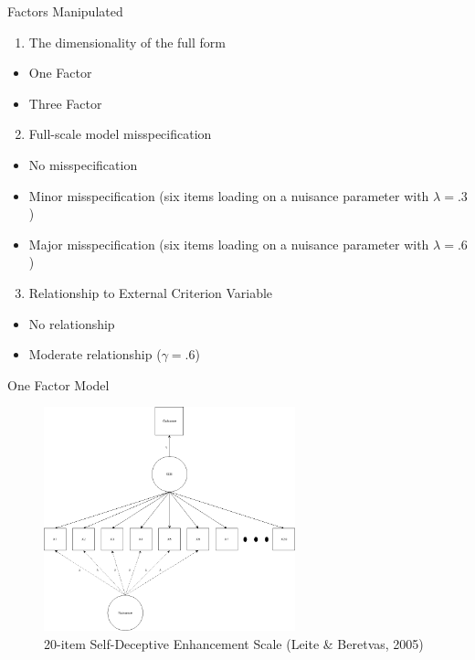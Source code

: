 \documentclass[ignorenonframetext,]{beamer}
\providecommand{\tightlist}{%
  \setlength{\itemsep}{0pt}\setlength{\parskip}{0pt}}
\begin{document}
\begin{frame}{Factors Manipulated}
\protect\hypertarget{factors-manipulated}{}

\begin{enumerate}
\tightlist
\item
  The dimensionality of the full form
\end{enumerate}

\begin{itemize}
\tightlist
\item
  One Factor
\item
  Three Factor
\end{itemize}

\begin{enumerate}
\setcounter{enumi}{1}
\tightlist
\item
  Full-scale model misspecification
\end{enumerate}

\begin{itemize}
\tightlist
\item
  No misspecification
\item
  Minor misspecification (six items loading on a nuisance parameter with
  \(\lambda=.3\))
\item
  Major misspecification (six items loading on a nuisance parameter with
  \(\lambda=.6\))
\end{itemize}

\begin{enumerate}
\setcounter{enumi}{2}
\tightlist
\item
  Relationship to External Criterion Variable
\end{enumerate}

\begin{itemize}
\tightlist
\item
  No relationship
\item
  Moderate relationship (\(\gamma = .6\))
\end{itemize}

\end{frame}

\begin{frame}{One Factor Model}
\protect\hypertarget{one-factor-model}{}

\begin{figure}
\centering
\includegraphics[width=2.86458in,height=\textheight]{Factor Diagrams/One Factor Diagram.png}
\caption{20-item Self-Deceptive Enhancement Scale (Leite \& Beretvas,
2005)}
\end{figure}

\end{frame}
\end{document}
